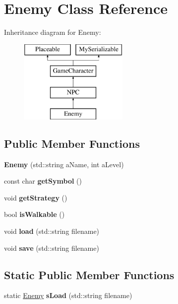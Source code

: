 \hypertarget{class_enemy}{}\section{Enemy Class Reference}
\label{class_enemy}
Inheritance diagram for Enemy\+:\begin{figure}[H]
\begin{center}
\leavevmode
\includegraphics[height=4.000000cm]{class_enemy}
\end{center}
\end{figure}
\subsection*{Public Member Functions}
\begin{DoxyCompactItemize}
\item 
\hypertarget{class_enemy_a64fb6f0fce2338a033588c9115593d21}{}\label{class_enemy_a64fb6f0fce2338a033588c9115593d21} 
{\bfseries Enemy} (std\+::string a\+Name, int a\+Level)
\item 
\hypertarget{class_enemy_ad1b2d1373f3344f23fa438eb73f315d6}{}\label{class_enemy_ad1b2d1373f3344f23fa438eb73f315d6} 
const char {\bfseries get\+Symbol} ()
\item 
\hypertarget{class_enemy_a16d7bdedccabfe8777d2d424a8dbe877}{}\label{class_enemy_a16d7bdedccabfe8777d2d424a8dbe877} 
void {\bfseries get\+Strategy} ()
\item 
\hypertarget{class_enemy_a34898829bc0fd2c0699f4bbe5ac8ed1a}{}\label{class_enemy_a34898829bc0fd2c0699f4bbe5ac8ed1a} 
bool {\bfseries is\+Walkable} ()
\item 
\hypertarget{class_enemy_ae025207363a769591c1accad3d1c2412}{}\label{class_enemy_ae025207363a769591c1accad3d1c2412} 
void {\bfseries load} (std\+::string filename)
\item 
\hypertarget{class_enemy_a186b6812f0fc859f1a67d02bb1a42a16}{}\label{class_enemy_a186b6812f0fc859f1a67d02bb1a42a16} 
void {\bfseries save} (std\+::string filename)
\end{DoxyCompactItemize}
\subsection*{Static Public Member Functions}
\begin{DoxyCompactItemize}
\item 
\hypertarget{class_enemy_a284a2d438cfa8e5de5fb796d351a04bb}{}\label{class_enemy_a284a2d438cfa8e5de5fb796d351a04bb} 
static \hyperlink{class_enemy}{Enemy} {\bfseries s\+Load} (std\+::string filename)
\end{DoxyCompactItemize}

